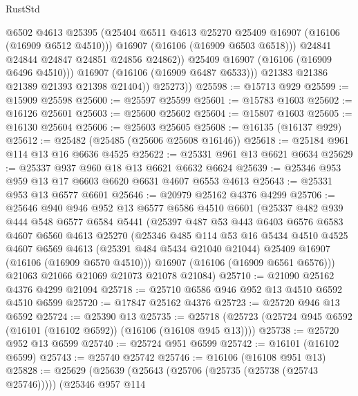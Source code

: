 \begin{lexlean}{RustStd}
\begin{coremodule}
                      @6502
                      @4613
                      @25395
                      (@25404 @6511 @4613 @25270 @25409 @16907 (@16106 (@16909 @6512 @4510)))
                      @16907
                      (@16106 (@16909 @6503 @6518)))
                    @24841
                    @24844
                    @24847
                    @24851
                    @24856
                    @24862))
                @25409
                @16907
                (@16106 (@16909 @6496 @4510)))
              @16907
              (@16106 (@16909 @6487 @6533)))
            @21383
            @21386
            @21389
            @21393
            @21398
            @21404))
        @25273))
@25598 := @15713 @929
@25599 := @15909 @25598
@25600 := @25597 @25599
@25601 := @15783 @1603
@25602 := @16126 @25601
@25603 := @25600 @25602
@25604 := @15807 @1603
@25605 := @16130 @25604
@25606 := @25603 @25605
@25608 := @16135 (@16137 @929)
@25612 := @25482 (@25485 (@25606 @25608 @16146))
@25618 := @25184 @961 @114 @13 @16 @6636 @4525
@25622 := @25331 @961 @13 @6621 @6634
@25629 := @25337 @937 @960 @18 @13 @6621 @6632 @6624
@25639 := @25346 @953 @959 @13 @17 @6603 @6620 @6631 @4607 @6553 @4613
@25643 := @25331 @953 @13 @6577 @6601
@25646 := @20979 @25162 @4376 @4299
@25706 := @25646
    @940
    @946
    @952
    @13
    @6577
    @6586
    @4510
    @6601
    (@25337
      @482
      @939
      @444
      @548
      @6577
      @6584
      @5441
      (@25397
        @487
        @53
        @443
        @6403
        @6576
        @6583
        @4607
        @6560
        @4613
        @25270
        (@25346
          @485
          @114
          @53
          @16
          @5434
          @4510
          @4525
          @4607
          @6569
          @4613
          (@25391 @484 @5434 @21040 @21044)
          @25409
          @16907
          (@16106 (@16909 @6570 @4510)))
        @16907
        (@16106 (@16909 @6561 @6576)))
      @21063
      @21066
      @21069
      @21073
      @21078
      @21084)
@25710 := @21090 @25162 @4376 @4299 @21094
@25718 := @25710 @6586 @946 @952 @13 @4510 @6592 @4510 @6599
@25720 := @17847 @25162 @4376
@25723 := @25720 @946 @13 @6592
@25724 := @25390 @13
@25735 := @25718 (@25723 (@25724 @945 @6592 (@16101 (@16102 @6592)) (@16106 (@16108 @945 @13))))
@25738 := @25720 @952 @13 @6599
@25740 := @25724 @951 @6599
@25742 := @16101 (@16102 @6599)
@25743 := @25740 @25742
@25746 := @16106 (@16108 @951 @13)
@25828 := @25629
    (@25639
      (@25643 (@25706 (@25735 (@25738 (@25743 @25746)))))
      (@25346
        @957
        @114

\end{coremodule}
\end{lexlean}

